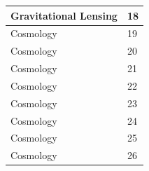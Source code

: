 \documentclass{book}
\begin{document}
\begin{table}[H]
\begin{tabular}{|ll|}
        Gravitational Lensing           & 18      \\ \hline
        Cosmology                       & 19      \\ \hline
        Cosmology                       & 20      \\ \hline
        Cosmology                       & 21      \\ \hline
        Cosmology                       & 22      \\ \hline
        Cosmology                       & 23      \\ \hline
        Cosmology                       & 24      \\ \hline
        Cosmology                       & 25      \\ \hline
        Cosmology                       & 26      \\ \hline
    \end{tabular}
\end{table}
\end{document}
